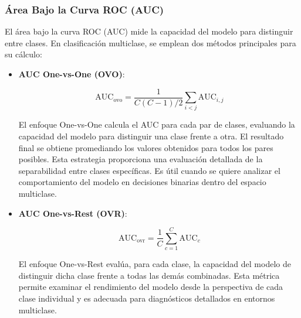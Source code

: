 \subsubsection*{Área Bajo la Curva ROC (AUC)}

El área bajo la curva ROC (AUC) mide la capacidad del modelo para distinguir entre clases. En clasificación multiclase, se emplean dos métodos principales para su cálculo:

\begin{itemize}

\item \textbf{AUC One-vs-One (OVO)}:

\begin{equation}
\text{AUC}_{\text{ovo}} = \frac{1}{C(C-1)/2} \sum_{i<j} \text{AUC}_{i,j}
\end{equation}

El enfoque One-vs-One calcula el AUC para cada par de clases, evaluando la capacidad del modelo para distinguir una clase frente a otra. El resultado final se obtiene promediando los valores obtenidos para todos los pares posibles. Esta estrategia proporciona una evaluación detallada de la separabilidad entre clases específicas. Es útil cuando se quiere analizar el comportamiento del modelo en decisiones binarias dentro del espacio multiclase.

\item \textbf{AUC One-vs-Rest (OVR)}:

\begin{equation}
\text{AUC}_{\text{ovr}} = \frac{1}{C} \sum_{c=1}^{C} \text{AUC}_c
\end{equation}

El enfoque One-vs-Rest evalúa, para cada clase, la capacidad del modelo de distinguir dicha clase frente a todas las demás combinadas. Esta métrica permite examinar el rendimiento del modelo desde la perspectiva de cada clase individual y es adecuada para diagnósticos detallados en entornos multiclase.

\end{itemize}
